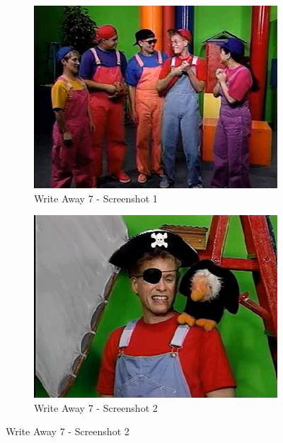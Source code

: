 \begin{figure}[H]
    \centering
    \begin{subfigure}{0.45\textwidth}
        \centering
        \includegraphics[width=\linewidth]{Games/WriteAway/Images/WriteAway7Screenshot1.png}
        \caption{Write Away 7 - Screenshot 1}
    \end{subfigure}
    \begin{subfigure}{0.45\textwidth}
        \centering
        \includegraphics[width=\linewidth]{Games/WriteAway/Images/WriteAway7Screenshot2.png}
        \caption{Write Away 7 - Screenshot 2}
    \end{subfigure}


\end{figure}

